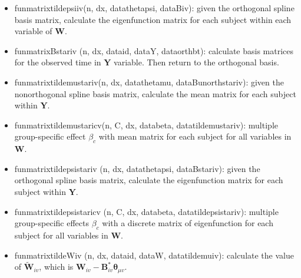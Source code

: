 \documentclass[useAMS,usenatbib,referee]{article}
\def\wt{\widetilde}
\newcommand{\BY}{{\pmb Y}}
\newcommand{\BW}{{\pmb W}}
\newcommand{\BB}{{\pmb B}}
\newcommand{\Bthe}{{\pmb \theta}}
\def\wt{\widetilde}
\begin{document}
\begin{itemize}
     \item  fun\textunderscore matrix\textunderscore tilde\textunderscore psi\textunderscore iv(n, dx, data\textunderscore theta\textunderscore psi, data\textunderscore B\textunderscore iv): given the orthogonal spline basis matrix, calculate the eigenfunction matrix for each subject within each variable of $\BW$.
     \item fun\textunderscore matrix\textunderscore B\textunderscore star\textunderscore iv (n, dx, data\textunderscore id, data\textunderscore Y, data\textunderscore orth\textunderscore b\textunderscore t): calculate basis matrices for the observed time in $\BY$ variable. Then return to the orthogonal basis. 
     \item  fun\textunderscore matrix\textunderscore tilde\textunderscore mu\textunderscore star\textunderscore iv(n, dx, data\textunderscore theta\textunderscore mu, data\textunderscore B\textunderscore unorth\textunderscore star\textunderscore iv): given the nonorthogonal spline basis matrix, calculate the mean matrix for each subject within $\BY$.
     \item  fun\textunderscore matrix\textunderscore tilde\textunderscore mu\textunderscore star\textunderscore ic\textunderscore v(n, C, dx, data\textunderscore beta, data\textunderscore tilde\textunderscore mu\textunderscore star\textunderscore iv): multiple group-specific effect $\beta_c$ with mean matrix for each subject for all variables in $\BW$.
     \item fun\textunderscore matrix\textunderscore tilde\textunderscore psi\textunderscore star\textunderscore iv (n, dx, data\textunderscore theta\textunderscore psi, data\textunderscore B\textunderscore star\textunderscore iv): given the orthogonal spline basis matrix, calculate the eigenfunction matrix for each subject within $\BY$.
     \item  fun\textunderscore matrix\textunderscore tilde\textunderscore psi\textunderscore star\textunderscore ic\textunderscore v (n, C, dx, data\textunderscore beta, data\textunderscore tilde\textunderscore psi\textunderscore star\textunderscore iv): multiple group-specific effects $\beta_c$ with  a discrete matrix of eigenfunction for each subject for all variables in $\BW$.
     \item  fun\textunderscore matrix\textunderscore tilde\textunderscore W\textunderscore iv (n, dx, data\textunderscore id, data\textunderscore W, data\textunderscore tilde\textunderscore mu\textunderscore iv): calculate the value of $\wt{\BW}_{iv}$, which is $\BW_{iv} - \BB_{iv}^* \Bthe_{\mu v}$. 

\end{itemize}
\end{document}
